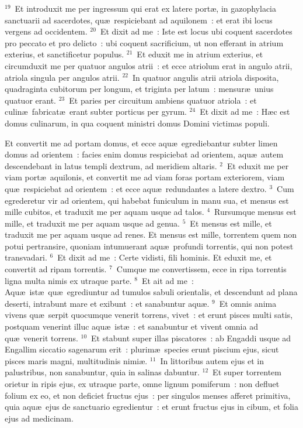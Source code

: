 ${}^{19}$~Et introduxit me per ingressum qui erat ex latere port\ae , in gazophylacia sanctuarii ad sacerdotes, qu\ae\ respiciebant ad aquilonem~: et erat ibi locus vergens ad occidentem.
${}^{20}$~Et dixit ad me~: Iste est locus ubi coquent sacerdotes pro peccato et pro delicto~: ubi coquent sacrificium, ut non efferant in atrium exterius, et sanctificetur populus.
${}^{21}$~Et eduxit me in atrium exterius, et circumduxit me per quatuor angulos atrii~: et ecce atriolum erat in angulo atrii, atriola singula per angulos atrii.
${}^{22}$~In quatuor angulis atrii atriola disposita, quadraginta cubitorum per longum, et triginta per latum~: mensur\ae\ unius quatuor erant.
${}^{23}$~Et paries per circuitum ambiens quatuor atriola~: et culin\ae\ fabricat\ae\ erant subter porticus per gyrum.
${}^{24}$~Et dixit ad me~: H\ae c est domus culinarum, in qua coquent ministri domus Domini victimas populi.

\bchapter
\lettrine[lines=3,image=true,loversize=0.05,lraise=-0.03]{E}{}t convertit me ad portam domus, et ecce aqu\ae\ egrediebantur subter limen domus ad orientem~: facies enim domus respiciebat ad orientem, aqu\ae\ autem descendebant in latus templi dextrum, ad meridiem altaris.
${}^{2}$~Et eduxit me per viam port\ae\ aquilonis, et convertit me ad viam foras portam exteriorem, viam qu\ae\ respiciebat ad orientem~: et ecce aqu\ae\ redundantes a latere dextro.
${}^{3}$~Cum egrederetur vir ad orientem, qui habebat funiculum in manu sua, et mensus est mille cubitos, et traduxit me per aquam usque ad talos.
${}^{4}$~Rursumque mensus est mille, et traduxit me per aquam usque ad genua.
${}^{5}$~Et mensus est mille, et traduxit me per aquam usque ad renes. Et mensus est mille, torrentem quem non potui pertransire, quoniam intumuerant aqu\ae\ profundi torrentis, qui non potest transvadari.
${}^{6}$~Et dixit ad me~: Certe vidisti, fili hominis. Et eduxit me, et convertit ad ripam torrentis.
${}^{7}$~Cumque me convertissem, ecce in ripa torrentis ligna multa nimis ex utraque parte.
${}^{8}$~Et ait ad me~: Aqu\ae\ ist\ae\ qu\ae\ egrediuntur ad tumulos sabuli orientalis, et descendunt ad plana deserti, intrabunt mare et exibunt~: et sanabuntur aqu\ae .
${}^{9}$~Et omnis anima vivens qu\ae\ serpit quocumque venerit torrens, vivet~: et erunt pisces multi satis, postquam venerint illuc aqu\ae\ ist\ae~: et sanabuntur et vivent omnia ad qu\ae\ venerit torrens.
${}^{10}$~Et stabunt super illas piscatores~: ab Engaddi usque ad Engallim siccatio sagenarum erit~: plurim\ae\ species erunt piscium ejus, sicut pisces maris magni, multitudinis nimi\ae .
${}^{11}$~In littoribus autem ejus et in palustribus, non sanabuntur, quia in salinas dabuntur.
${}^{12}$~Et super torrentem orietur in ripis ejus, ex utraque parte, omne lignum pomiferum~: non defluet folium ex eo, et non deficiet fructus ejus~: per singulos menses afferet primitiva, quia aqu\ae\ ejus de sanctuario egredientur~: et erunt fructus ejus in cibum, et folia ejus ad medicinam.


